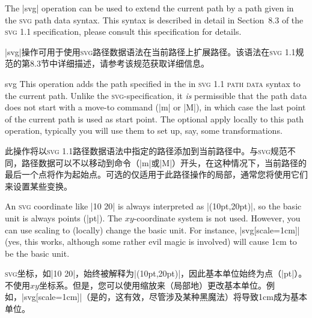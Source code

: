 The |svg| operation can be used to extend the current path by a path given in
the \textsc{svg} path data syntax. This syntax is described in detail in
Section~8.3 of the \textsc{svg 1.1} specification, please consult this
specification for details.

|svg|操作可用于使用\textsc{svg}路径数据语法在当前路径上扩展路径。该语法在\textsc{svg 1.1}规范的第8.3节中详细描述，请参考该规范获取详细信息。


\begin{pathoperation}{svg}{}
    This operation adds the path specified in the  in
    \textsc{svg 1.1 path data} syntax to the current path. Unlike the
    \textsc{svg}-specification, it \emph{is} permissible that the path data
    does not start with a move-to command (|m| or |M|), in which case the last
    point of the current path is used as start point. The optional
     apply locally to this path operation, typically you will use
    them to set up, say, some transformations.

    此操作将以\textsc{svg 1.1路径数据}语法中指定的路径添加到当前路径中。与\textsc{svg}规范不同，路径数据可以不以移动到命令（|m|或|M|）开头，在这种情况下，当前路径的最后一个点将作为起始点。可选的仅适用于此路径操作的局部，通常您将使用它们来设置某些变换。

\begin{codeexample}[preamble={\usetikzlibrary{svg.path}}]
\end{codeexample}

    An \textsc{svg} coordinate like |10 20| is always interpreted as
    |(10pt,20pt)|, so the basic unit is always points (|pt|). The
    $xy$-coordinate system is not used. However, you can use scaling to
    (locally) change the basic unit. For instance, |svg[scale=1cm]| (yes, this
    works, although some rather evil magic is involved) will cause 1cm to be
    the basic unit.

    \textsc{svg}坐标，如|10 20|，始终被解释为|(10pt,20pt)|，因此基本单位始终为点（|pt|）。不使用$xy$坐标系。但是，您可以使用缩放来（局部地）更改基本单位。例如，|svg[scale=1cm]|（是的，这有效，尽管涉及某种黑魔法）将导致1cm成为基本单位。



\end{pathoperation}
